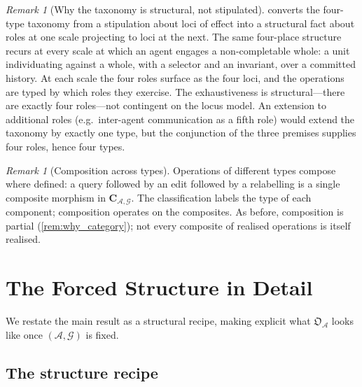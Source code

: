 \documentclass[11pt,a4paper]{article}
\theoremstyle{thmstyle}
\theoremstyle{definition}
\theoremstyle{remark}
\newtheorem{remark}[theorem]{Remark}
\newcommand{\Graph}{\mathcal{G}}
\newcommand{\Agent}{\mathcal{A}}
\newcommand{\OpStr}{\mathfrak{O}}
\begin{document}
\begin{remark}[Why the taxonomy is structural, not stipulated]
\label{rem:taxonomy_honest}
 converts the four-type taxonomy from
a stipulation about loci of effect into a structural fact about
roles at one scale projecting to loci at the next. The same
four-place structure recurs at every scale at which an agent
engages a non-completable whole: a unit individuating against a
whole, with a selector and an invariant, over a committed history.
At each scale the four roles surface as the four loci, and the
operations are typed by which roles they exercise. The
exhaustiveness is structural---there are exactly four roles---not
contingent on the locus model. An extension to additional roles
(e.g.\ inter-agent communication as a fifth role) would extend the
taxonomy by exactly one type, but the conjunction of the three
premises supplies four roles, hence four types.
\end{remark}

\begin{remark}[Composition across types]
\label{rem:cross_type}
Operations of different types compose where defined: a query
followed by an edit followed by a relabelling is a single
composite morphism in $\mathbf{C}_{\Agent,\Graph}$. The
classification labels the type of each component; composition
operates on the composites. As before, composition is partial
(\cref{rem:why_category}); not every composite of realised
operations is itself realised.
\end{remark}

\section{The Forced Structure in Detail}
\label{sec:detail}

We restate the main result as a structural recipe, making explicit
what $\OpStr_\Agent$ looks like once $(\Agent, \Graph)$ is fixed.

\subsection{The structure recipe}
\end{document}
